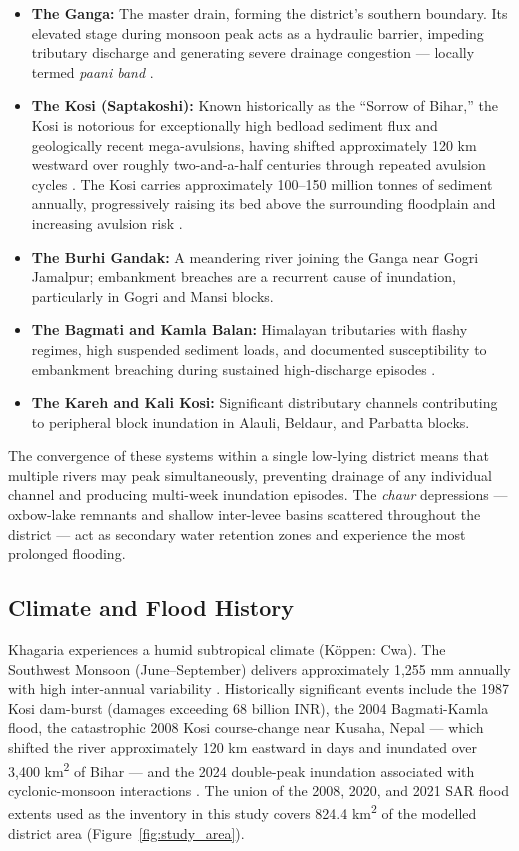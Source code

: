 \documentclass[12pt, a4paper]{article}
\begin{document}
\begin{itemize}
    \item \textbf{The Ganga:} The master drain, forming the district's southern boundary. Its elevated stage during monsoon peak acts as a hydraulic barrier, impeding tributary discharge and generating severe drainage congestion --- locally termed \textit{paani band} \citep{beams2024}.
    \item \textbf{The Kosi (Saptakoshi):} Known historically as the ``Sorrow of Bihar,'' the Kosi is notorious for exceptionally high bedload sediment flux and geologically recent mega-avulsions, having shifted approximately 120 km westward over roughly two-and-a-half centuries through repeated avulsion cycles \citep{sinha2008, mishra2018}. The Kosi carries approximately 100--150 million tonnes of sediment annually, progressively raising its bed above the surrounding floodplain and increasing avulsion risk \citep{sinha2008}.
    \item \textbf{The Burhi Gandak:} A meandering river joining the Ganga near Gogri Jamalpur; embankment breaches are a recurrent cause of inundation, particularly in Gogri and Mansi blocks.
    \item \textbf{The Bagmati and Kamla Balan:} Himalayan tributaries with flashy regimes, high suspended sediment loads, and documented susceptibility to embankment breaching during sustained high-discharge episodes \citep{mishra2018}.
    \item \textbf{The Kareh and Kali Kosi:} Significant distributary channels contributing to peripheral block inundation in Alauli, Beldaur, and Parbatta blocks.
\end{itemize}

The convergence of these systems within a single low-lying district means that multiple rivers may peak simultaneously, preventing drainage of any individual channel and producing multi-week inundation episodes. The \textit{chaur} depressions --- oxbow-lake remnants and shallow inter-levee basins scattered throughout the district --- act as secondary water retention zones and experience the most prolonged flooding.

\subsection{Climate and Flood History}

Khagaria experiences a humid subtropical climate (K\"{o}ppen: Cwa). The Southwest Monsoon (June--September) delivers approximately 1,255 mm annually with high inter-annual variability \citep{beams2024}. Historically significant events include the 1987 Kosi dam-burst (damages exceeding 68 billion INR), the 2004 Bagmati-Kamla flood, the catastrophic 2008 Kosi course-change near Kusaha, Nepal --- which shifted the river approximately 120 km eastward in days and inundated over 3,400 km\textsuperscript{2} of Bihar \citep{bhuvan2010, mishra2018} --- and the 2024 double-peak inundation associated with cyclonic-monsoon interactions \citep{tatatrusts2024}. The union of the 2008, 2020, and 2021 SAR flood extents used as the inventory in this study covers 824.4 km\textsuperscript{2} of the modelled district area (Figure~\ref{fig:study_area}).
\end{document}
